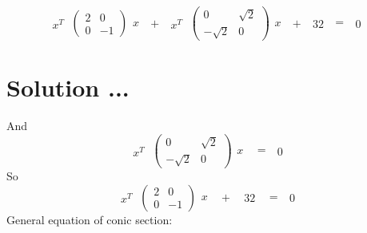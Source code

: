 \documentclass{beamer}
\begin{document}
\[
\begin{matrix}
\textbf{$x^T$}
\end{matrix} 
\
%
\left( \begin{array}{cc}
2 &0 \\
0& -1
\end{array} \right)
%
\begin{matrix}
\textbf{$x$}
\end{matrix} 
\
%
\begin{matrix}
+
\end{matrix} 
\
\begin{matrix}
\textbf{$x^T$}
\end{matrix} 
\
%
\left( \begin{array}{cc}
0 &\sqrt{2} \\
-\sqrt{2}& 0
\end{array} \right)
%
\begin{matrix}
\textbf{$x$}
\end{matrix} 
\
%
\begin{matrix}
+
\end{matrix} 
\
%
\begin{matrix}
\textbf{$32$}
\end{matrix} 
\
%
\begin{matrix}
=
\end{matrix} 
\
%
\begin{matrix}
0
\end{matrix} 
\
\]
\section{Solution ...}
And
\[
\
\begin{matrix}
\textbf{$x^T$}
\end{matrix} 
\
%
\left( \begin{array}{cc}
0 &\sqrt{2} \\
-\sqrt{2}& 0
\end{array} \right)
%
\begin{matrix}
\textbf{$x$}
\end{matrix} 
\
%
\
\begin{matrix}
=
\end{matrix} 
\
%
\begin{matrix}
0
\end{matrix} 
\
\]
So
\[
\
\begin{matrix}
\textbf{$x^T$}
\end{matrix} 
\
%
\left( \begin{array}{cc}
2 &0 \\
0& -1
\end{array} \right)
%
\begin{matrix}
\textbf{$x$}
\end{matrix} 
\
%
\
\begin{matrix}
+
\end{matrix} 
\
%
\
\begin{matrix}
32
\end{matrix} 
\
%
\
\begin{matrix}
=
\end{matrix} 
\
%
\begin{matrix}
0
\end{matrix} 
\
\]
General equation of conic section:
\end{document}
